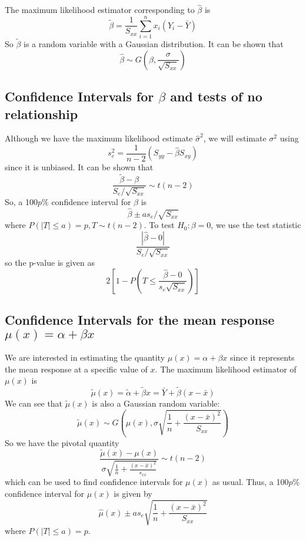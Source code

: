 \documentclass[12pt]{article}
\begin{document}
The maximum likelihood estimator corresponding to $\hat \beta$ is \[\tilde\beta=\frac{1}{S_{xx}}\sum_{i=1}^nx_i(Y_i-\bar{Y})\]
So $\tilde\beta$ is a random variable with a Gaussian distribution. It can be shown that\[\hat\beta\sim G\left(\beta,\frac{\sigma}{\sqrt{S_{xx}}}\right)\]

\subsection{Confidence Intervals for $\beta$ and tests of no relationship}
Although we have the maximum likelihood estimate $\hat{\sigma}^2$, we will estimate $\sigma^2$ using \[s_e^2=\frac{1}{n-2}(S_{yy}-\hat{\beta}S_{xy})\] since it is unbiased. It can be shown that \[\frac{\tilde\beta-\beta}{S_e/\sqrt{S_{xx}}}\sim t(n-2)\] So, a 100$p\%$ confidence interval for $\beta$ is \[\hat\beta\pm as_e/\sqrt{S_{xx}}\] where $P(|T|\leq a)=p, T\sim t(n-2)$. To test $H_0:\beta=0$, we use the test statistic\[\frac{|\hat\beta-0|}{S_e/\sqrt{S_{xx}}}\]so the p-value is given as \[2\left[1-P(T\leq\frac{\hat\beta-0}{s_e\sqrt{S_{xx}}})\right]\]
\subsection{Confidence Intervals for the mean response $\mu(x)=\alpha+\beta x$}
We are interested in estimating the quantity $\mu(x)=\alpha+\beta x$ since it represents the mean response at a specific value of $x$. The maximum likelihood estimator of $\mu(x)$ is \[\tilde\mu(x)=\tilde\alpha+\tilde\beta x=\bar Y+\tilde\beta(x-\bar{x})\] 
We can see that $\tilde\mu(x)$ is also a Gaussian random variable:\[\tilde\mu(x)\sim G\left(\mu(x),\sigma\sqrt{\frac{1}{n}+\frac{(x-\bar x)^2}{S_{xx}}}\right)\]
So we have the pivotal quantity \[\frac{\tilde\mu(x)-\mu(x)}{\sigma\sqrt{\frac{1}{n}+\frac{(x-\bar x)^2}{s_{xx}}}}\sim t(n-2)\] which can be used to find confidence intervals for $\mu(x)$ as usual. Thus, a 100$p\%$ confidence interval for $\mu(x)$ is given by \[\hat{\mu}(x)\pm as_e\sqrt{\frac{1}{n}+\frac{(x-\bar x)^2}{S_{xx}}}\] where $P(|T|\leq a)=p$. 
\end{document}
